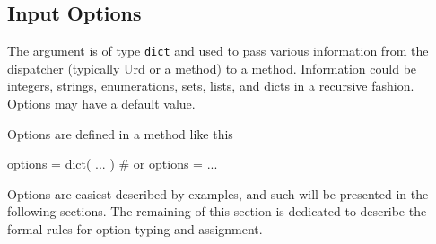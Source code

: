 \subsection{Input Options}

The \options argument is of type \texttt{dict} and used to pass
various information from the dispatcher (typically Urd or a method) to
a method.  Information could be integers, strings, enumerations, sets,
lists, and dicts in a recursive fashion.  Options may have a default
value.

Options are defined in a method like this
\begin{python}
  options = dict( ... )  # or
  options = { ... }
\end{python}

Options are easiest described by examples, and such will be presented
in the following sections.  The remaining of this section is dedicated
to describe the formal rules for option typing and assignment.

